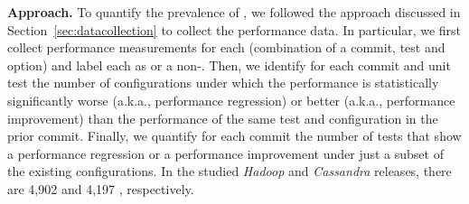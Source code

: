 \noindent \textbf{Approach.}
To quantify the prevalence of \inconsistent, we followed the approach discussed in Section~\ref{sec:datacollection} to collect the performance data. In particular, we first collect performance measurements for each \textbf{\instance} (combination of a  commit, test and option) and label each \instance as \inconsistent or a non-\inconsistent. %
Then, we identify for each commit and unit test the number of configurations under which the performance is statistically significantly worse (a.k.a., performance regression) or better (a.k.a., performance improvement) than the performance of the same test and configuration in the prior commit. Finally, we quantify for each commit the number of tests that show a performance regression or a performance improvement under just a subset of the existing configurations. %
In the studied \emph{Hadoop} and \emph{Cassandra} releases, there are 4,902 and 4,197 \instance, respectively. 


